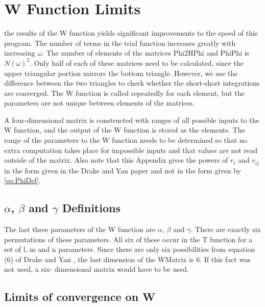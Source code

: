 \documentclass[Dissertation.tex]{subfiles}
\begin{document}
\chapter{W Function Limits}
\label{chp:WLimits}

\iftoggle{UNT}{Precalculating}{\lettrine{\textcolor{startcolor}{P}}{recalculating}}
the results of the W 
function yields significant improvements to the speed of this program.  The 
number of terms in the trial function increases greatly with increasing
$\omega$. The number of elements of the matrices Phi2HPhi and PhiPhi is
$N(\omega)^2$. Only half of each of these matrices need to be calculated, 
since the upper triangular portion mirrors the bottom triangle. However, we 
use the difference between the two triangles to check whether the short-short 
integrations are converged. The W function is called repeatedly for each 
element, but the parameters are not unique between elements of the matrices.

A four-dimensional matrix is constructed with ranges of all possible inputs 
to the W function, and the output of the W function is stored as the 
elements.  The range of the parameters to the W function needs to be 
determined so that no extra computation takes place for impossible inputs and 
that values are not read outside of the matrix. Also note that this Appendix
gives the powers of $r_i$ and $r_{ij}$ in the form given in the Drake and
Yan \cite{Drake1995} paper and not in the form given by \cref{eq:PhiDef}.

\section{\texorpdfstring{$\alpha$, $\beta$ and $\gamma$} {alpha, beta and gamma} Definitions}

The last three parameters of the W function are $\alpha$, $\beta$ and $\gamma$.
There are exactly six permutations of these parameters. All six of these 
occur in the T function for a set of l, m and n parameters. Since there are 
only six possibilities from equation (6) of Drake and Yan \cite{Drake1995}, 
the last dimension of the WMatrix is 6. If this fact was not used, a six-
dimensional matrix would have to be used.

\section{Limits of convergence on W}
\end{document}
